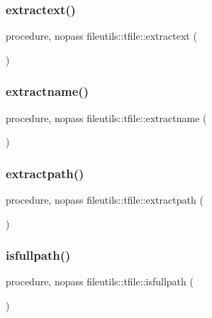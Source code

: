 \subsubsection{\texorpdfstring{extractext()}{extractext()}}
{\footnotesize\ttfamily procedure, nopass fileutils\+::tfile\+::extractext (\begin{DoxyParamCaption}{ }\end{DoxyParamCaption})\hspace{0.3cm}{\ttfamily [private]}}

\mbox{\label{structfileutils_1_1tfile_a28563a736ee9c0cc8275fc84ee4b731a}} 
\subsubsection{\texorpdfstring{extractname()}{extractname()}}
{\footnotesize\ttfamily procedure, nopass fileutils\+::tfile\+::extractname (\begin{DoxyParamCaption}{ }\end{DoxyParamCaption})\hspace{0.3cm}{\ttfamily [private]}}

\mbox{\label{structfileutils_1_1tfile_a2894e82403ee6883defa2760cc1daf6a}} 
\subsubsection{\texorpdfstring{extractpath()}{extractpath()}}
{\footnotesize\ttfamily procedure, nopass fileutils\+::tfile\+::extractpath (\begin{DoxyParamCaption}{ }\end{DoxyParamCaption})\hspace{0.3cm}{\ttfamily [private]}}

\mbox{\label{structfileutils_1_1tfile_a915fecc92139d885a612c683cfabb722}} 
\subsubsection{\texorpdfstring{isfullpath()}{isfullpath()}}
{\footnotesize\ttfamily procedure, nopass fileutils\+::tfile\+::isfullpath (\begin{DoxyParamCaption}{ }\end{DoxyParamCaption})\hspace{0.3cm}{\ttfamily [private]}}

